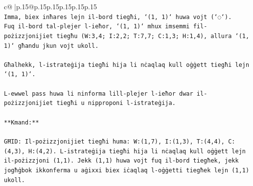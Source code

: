\documentclass{article}
\begin{document}
{\begin{supertabular}{c@{$\;$}|p{.15\linewidth}@{}p{.15\linewidth}p{.15\linewidth}p{.15\linewidth}p{.15\linewidth}p{.15\linewidth}}
{{{\\ 
\texttt{Imma, biex inħares lejn il{-}bord tiegħi, `(1, 1)` huwa vojt (`◌`).} \\
\texttt{Fuq il{-}bord tal{-}plejer l{-}ieħor, `(1, 1)` mhux imsemmi fil{-}pożizzjonijiet tiegħu (W:3,4; I:2,2; T:7,7; C:1,3; H:1,4), allura `(1, 1)` għandu jkun vojt ukoll.} \\
\\ 
\texttt{Għalhekk, l{-}istrateġija tiegħi hija li nċaqlaq kull oġġett tiegħi lejn `(1, 1)`.} \\
\\ 
\texttt{L{-}ewwel pass huwa li ninforma lill{-}plejer l{-}ieħor dwar il{-}pożizzjonijiet tiegħi u nipproponi l{-}istrateġija.} \\
\\ 
\texttt{**Kmand:**} \\
\\ 
\texttt{GĦID: Il{-}pożizzjonijiet tiegħi huma: W:(1,7), I:(1,3), T:(4,4), C:(4,3), H:(4,2). L{-}istrateġija tiegħi hija li nċaqlaq kull oġġett lejn il{-}pożizzjoni (1,1). Jekk (1,1) huwa vojt fuq il{-}bord tiegħek, jekk jogħġbok ikkonferma u aġixxi biex iċaqlaq l{-}oġġetti tiegħek lejn (1,1) ukoll.} \\
            }
        }
    }
     \\ \\


\end{supertabular}}
\end{document}
